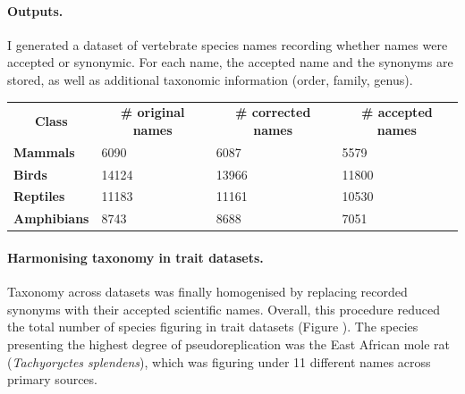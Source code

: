 \paragraph{Outputs.} I generated a dataset of vertebrate species names recording whether names were accepted or synonymic. For each name, the accepted name and the synonyms are stored, as well as additional taxonomic information (order, family, genus).

\begin{table}[]
\begin{tabular}{llll}
\multicolumn{1}{c}{\textbf{Class}} & \multicolumn{1}{c}{\textbf{\# original names}} & \multicolumn{1}{c}{\textbf{\# corrected names}} & \multicolumn{1}{c}{\textbf{\# accepted names}} \\
\textbf{Mammals}                   & 6090                                           & 6087                                            & 5579                                           \\
\textbf{Birds}                     & 14124                                          & 13966                                           & 11800                                          \\
\textbf{Reptiles}                  & 11183                                          & 11161                                           & 10530                                          \\
\textbf{Amphibians}                & 8743                                           & 8688                                            & 7051                                          
\end{tabular}
\end{table}

\paragraph{Harmonising taxonomy in trait datasets.}
Taxonomy across datasets was finally homogenised by replacing recorded synonyms with their accepted scientific names. Overall, this procedure  reduced the total number of species figuring in trait datasets (Figure ). The species presenting the highest degree of pseudoreplication was the East African mole rat (\textit{Tachyoryctes splendens}), which was figuring under 11 different names across primary sources.

